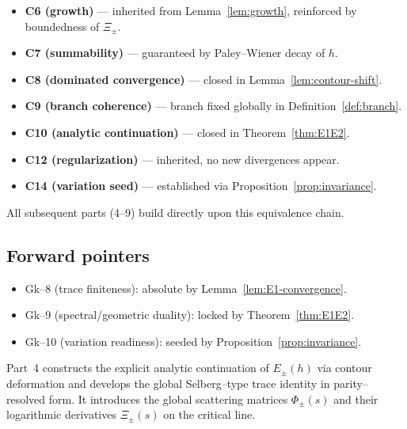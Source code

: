 \begin{remark}
\label{rem:compliance-summary-ch6p3}
\begin{itemize}[leftmargin=*, itemsep=2pt]
  \item \textbf{C6 (growth)} — inherited from Lemma~\ref{lem:growth}, reinforced by boundedness of $\Xi_\pm$. %
  \item \textbf{C7 (summability)} — guaranteed by Paley–Wiener decay of $h$. %
  \item \textbf{C8 (dominated convergence)} — closed in Lemma~\ref{lem:contour-shift}. %
  \item \textbf{C9 (branch coherence)} — branch fixed globally in Definition~\ref{def:branch}. %
  \item \textbf{C10 (analytic continuation)} — closed in Theorem~\ref{thm:E1E2}. %
  \item \textbf{C12 (regularization)} — inherited, no new divergences appear. %
  \item \textbf{C14 (variation seed)} — established via Proposition~\ref{prop:invariance}. %
\end{itemize}
All subsequent parts (4–9) build directly upon this equivalence chain. %
\end{remark}

\subsection{Forward pointers}
\label{subsec:ch6-part3-forward} \relax

\begin{itemize}[leftmargin=*, itemsep=2pt]
  \item Gk–8 (trace finiteness): absolute by Lemma~\ref{lem:E1-convergence}. %
  \item Gk–9 (spectral/geometric duality): locked by Theorem~\ref{thm:E1E2}. %
  \item Gk–10 (variation readiness): seeded by Proposition~\ref{prop:invariance}. %
\end{itemize}

Part~4 constructs the explicit analytic continuation of $E_\pm(h)$ via contour deformation and develops the global Selberg–type trace identity in parity–resolved form.  
It introduces the global scattering matrices $\Phi_\pm(s)$ and their logarithmic derivatives $\Xi_\pm(s)$ on the critical line. %

